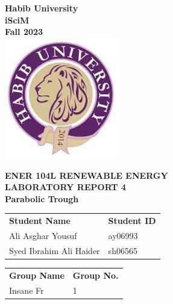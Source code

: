 \documentclass[a4paper, 12pt, english]{article}
\begin{document}
\begin{titlepage}
	\begin{center}
		\textbf{\LARGE Habib University}\\[0.5cm]
		\textbf{\large iSciM}\\[0.2cm]
		\textbf {\large Fall 2023}\\[0.2cm]
		\vspace{20pt}
		\includegraphics[width=5cm]{../habiblogo.jpg}\\[1cm]
		\par
		\vspace{20pt}
		\textbf{\Large ENER 104L RENEWABLE ENERGY}\\
		\vspace{15pt}
		\myrule[1pt][7pt]
		\textbf{\LARGE  LABORATORY REPORT 4}\\
		\vspace{15pt}
		\textbf{\large Parabolic Trough}\\
		\myrule[1pt][7pt]
		\vspace{25pt}
		\begin{tabular}{@{}p{5cm}p{3cm}@{}}
			\textbf{\large Student Name} & \textbf{\large Student ID} \\
			Ali Asghar Yousuf            & ay06993                    \\ %
			Syed Ibrahim Ali Haider      & sh06565                    \\ %
		\end{tabular}

		\vspace{10pt}
		\begin{tabular}{@{}p{5cm}p{3cm}@{}}
			\textbf{\large Group Name} & \textbf{\large Group No.} \\
			Insane Fr                  & 1                         \\
		\end{tabular}


\end{center}
\end{titlepage}
\end{document}
